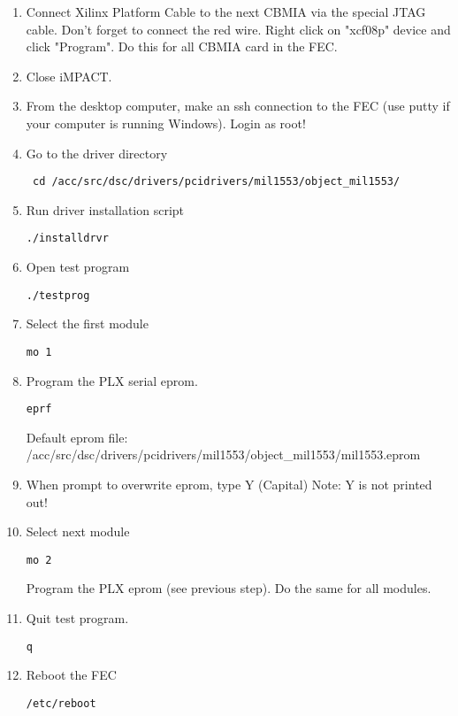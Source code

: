 \documentclass[11pt,a4paper]{article}
\begin{document}
\begin{enumerate}
	\item Connect Xilinx Platform Cable to the next CBMIA via the special JTAG cable. Don't forget to connect the red wire.
				\newline Right click on "xcf08p" device and click "Program".
				\newline Do this for all CBMIA card in the FEC.
	\item Close iMPACT.
	\item From the desktop computer, make an ssh connection to the FEC (use putty if your computer is running Windows). Login as root!
	\item Go to the driver directory 
				\begin{verbatim} cd /acc/src/dsc/drivers/pcidrivers/mil1553/object_mil1553/ \end{verbatim}
	\item Run driver installation script \begin{verbatim}./installdrvr\end{verbatim}
	\item Open test program \begin{verbatim}./testprog\end{verbatim}
	\item Select the first module \begin{verbatim}mo 1\end{verbatim}
	\item	Program the PLX serial eprom.
				\begin{verbatim}eprf\end{verbatim}
				Default eprom file:\newline
				/acc/src/dsc/drivers/pcidrivers/mil1553/object\_mil1553/mil1553.eprom
	\item When prompt to overwrite eprom, type Y (Capital)
				\newline Note: Y is not printed out!
	\item Select next module \begin{verbatim}mo 2\end{verbatim}
				Program the PLX eprom (see previous step). 
				\newline Do the same for all modules.
	\item Quit test program.
				\begin{verbatim}q\end{verbatim}
	\item Reboot the FEC
				\begin{verbatim}/etc/reboot\end{verbatim}

\end{enumerate}
\end{document}
